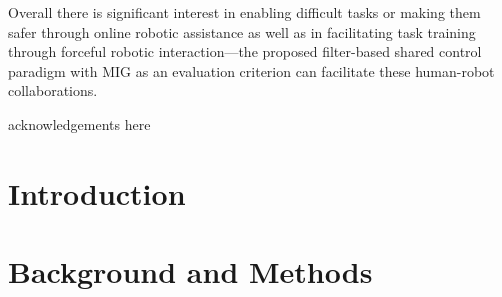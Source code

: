 \documentclass[12pt]{nuthesis}	%
\begin{document}
Overall there is significant interest in enabling difficult tasks or making them safer through online robotic assistance as well as in facilitating task training through forceful robotic interaction---the proposed filter-based shared control paradigm with MIG as an evaluation criterion can facilitate these human-robot collaborations. 


\acknowledgements	%

acknowledgements here




%
%
%
%
%
%
%
%

\clearpage{} %
\tableofcontents	%

\clearpage{} %
\listoftables		%

\clearpage{} %
\listoffigures		%



\mainmatter             %



\chapter{Introduction}	%
\label{chapter: intro}


%

\chapter{Background and Methods}
\label{chapter: methods}	

\end{document}
